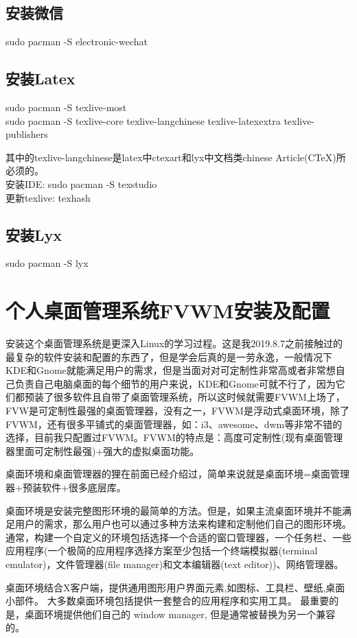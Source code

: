 \documentclass[utf8]{book}
\begin{document}
\begin{appendices}
	\section{安装微信}\label{m13}
	sudo pacman -S electronic-wechat

	\section{安装Latex}\label{m14}
	\indent sudo pacman -S texlive-most\\
	\indent sudo pacman -S texlive-core texlive-langchinese texlive-latexextra texlive-publishers
	
	其中的texlive-langchinese是latex中ctexart和lyx中文档类chinese Article(CTeX)所必须的。\\
	\indent 安装IDE: sudo pacman -S texstudio\\
	\indent 更新texlive: texhash
	
	\section{安装Lyx}\label{m15}
	sudo pacman -S lyx
	
	
	\chapter{个人桌面管理系统FVWM安装及配置}\label{append5}
	安装这个桌面管理系统是更深入Linux的学习过程。这是我2019.8.7之前接触过的最复杂的软件安装和配置的东西了，但是学会后真的是一劳永逸，一般情况下KDE和Gnome就能满足用户的需求，但是当面对对可定制性非常高或者非常想自己负责自己电脑桌面的每个细节的用户来说，KDE和Gnome可就不行了，因为它们都预装了很多软件且自带了桌面管理系统，所以这时候就需要FVWM上场了，FVW是可定制性最强的桌面管理器，没有之一，FVWM是浮动式桌面环境，除了FVWM，还有很多平铺式的桌面管理器，如：i3、awesome、dwm等非常不错的选择，目前我只配置过FVWM。FVWM的特点是：高度可定制性(现有桌面管理器里面可定制性最强)+强大的虚拟桌面功能。
	
	桌面环境和桌面管理器的狸在前面已经介绍过，简单来说就是桌面环境=桌面管理器+预装软件+很多底层库。
	
	桌面环境是安装完整图形环境的最简单的方法。但是，如果主流桌面环境并不能满足用户的需求，那么用户也可以通过多种方法来构建和定制他们自己的图形环境。通常，构建一个自定义的环境包括选择一个合适的窗口管理器，一个任务栏、一些应用程序(一个极简的应用程序选择方案至少包括一个终端模拟器(terminal emulator)，文件管理器(file manager)和文本编辑器(text editor))、网络管理器。
	
	桌面环境结合X客户端，提供通用图形用户界面元素,如图标、工具栏、壁纸,桌面小部件。 大多数桌面环境包括提供一套整合的应用程序和实用工具。 最重要的是，桌面环境提供他们自己的 window manager, 但是通常被替换为另一个兼容的。
	

\end{appendices}
\end{document}

